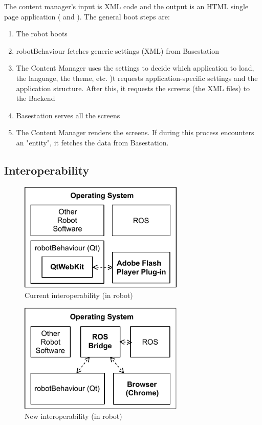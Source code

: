 The content manager's input is \ac{XML} code and the output is an \ac{HTML} single page application ( and ).
The general boot steps are:

\begin{enumerate}
    \item The robot boots
    \item robotBehaviour fetches generic settings (\ac{XML}) from Basestation
    \item The Content Manager uses the settings to decide which application to load, the language, the theme, etc. )t requests application-specific settings and the application structure. After this, it requests the screens (the \ac{XML} files) to the Backend
    \item Basestation serves all the screens
    \item The Content Manager renders the screens. If during this process encounters an "entity", it fetches the data from Basestation.
\end{enumerate}


\subsection{Interoperability}
\begin{figure}[htb]
    \centering
    \includegraphics[width=0.7\textwidth]{figures/interoperability-original}
    \caption{Current interoperability (in robot)}
    \label{fig:interoperability-original}
\end{figure}

\begin{figure}[htb]
    \centering
    \includegraphics[width=0.7\textwidth]{figures/interoperability-new}
    \caption{New interoperability (in robot)}
    \label{fig:interoperability-new}
\end{figure}

